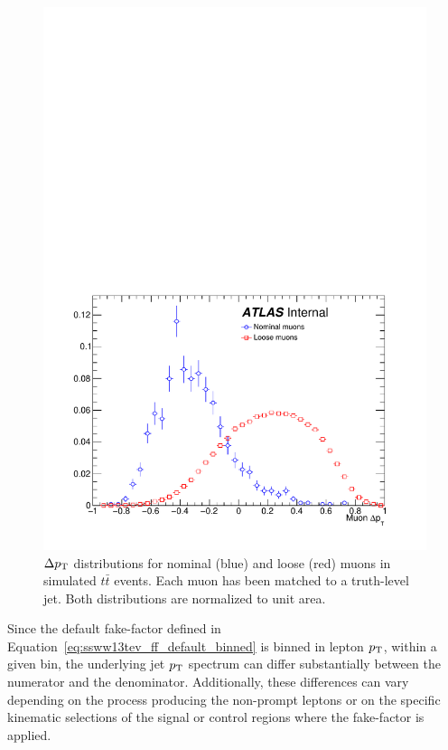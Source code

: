 \begin{figure}[htbp]
  \centering
  \includegraphics[width=.6\textwidth]{figs/ssww_13tev/backgrounds/ff/deltapt_ttbar}
  \caption{$\Delta p_{\mathrm{T}}$ distributions for nominal (blue) and loose (red) muons in simulated $t\bar{t}$ events.  Each muon has been matched to a truth-level jet.  Both distributions are normalized to unit area.}
  \label{fig:ssww13tev_ff_deltapt}
\end{figure}

Since the default fake-factor defined in Equation~\ref{eq:ssww13tev_ff_default_binned} is binned in lepton $p_{\mathrm{T}}$, within a given bin, the underlying jet $p_{\mathrm{T}}$ spectrum can differ substantially between the numerator and the denominator.
Additionally, these differences can vary depending on the process producing the non-prompt leptons or on the specific kinematic selections of the signal or control regions where the fake-factor is applied.

